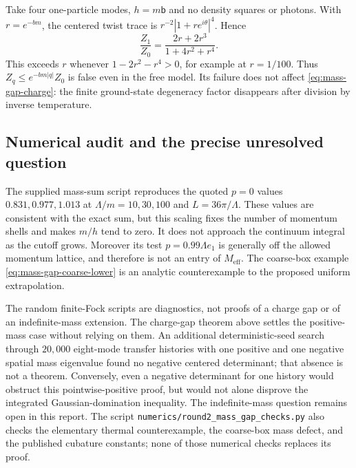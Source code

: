 \begin{remark}
\label{rem:mass-gap-thermal}
Take four one-particle modes, $h=m\mathsf b$ and no density squares or
photons. With $r=e^{-bm}$, the centered twist trace is
$r^{-2}|1+r e^{i\theta}|^4$. Hence
\[
 \frac{Z_1}{Z_0}=\frac{2r+2r^3}{1+4r^2+r^4}.
\]
This exceeds $r$ whenever $1-2r^2-r^4>0$, for example at $r=1/100$.
Thus $Z_q\le e^{-bm|q|}Z_0$ is false even in the free model. Its failure
does not affect \eqref{eq:mass-gap-charge}: the finite ground-state
degeneracy factor disappears after division by inverse temperature.
\end{remark}

\subsection{Numerical audit and the precise unresolved question}
\label{subsec:mass-gap-numerics}

The supplied mass-sum script reproduces the quoted $p=0$ values
$0.831,0.977,1.013$ at $\Lambda/m=10,30,100$ and
$L=36\pi/\Lambda$. These values are consistent with the exact sum, but
this scaling fixes the number of momentum shells and makes $m/h$ tend
to zero. It does not approach the continuum integral as the cutoff
grows. Moreover its test $p=0.99\Lambda e_1$ is generally off the allowed
momentum lattice, and therefore is not an entry of $M_{\mathrm{eff}}$.
The coarse-box example \eqref{eq:mass-gap-coarse-lower} is an analytic
counterexample to the proposed uniform extrapolation.

The random finite-Fock scripts are diagnostics, not proofs of a charge
gap or of an indefinite-mass extension. The charge-gap theorem above
settles the positive-mass case without relying on them. An additional
deterministic-seed search through $20{,}000$ eight-mode transfer histories
with one positive and one negative spatial mass eigenvalue found no
negative centered determinant; that absence is not a theorem. Conversely,
even a negative determinant for one history would obstruct this
pointwise-positive proof, but would not alone disprove the integrated
Gaussian-domination inequality. The indefinite-mass question remains
open in this report. The script
\texttt{numerics/round2\_mass\_gap\_checks.py} also checks the elementary
thermal counterexample, the coarse-box mass defect, and the published
cubature constants; none of those numerical checks replaces its proof.
